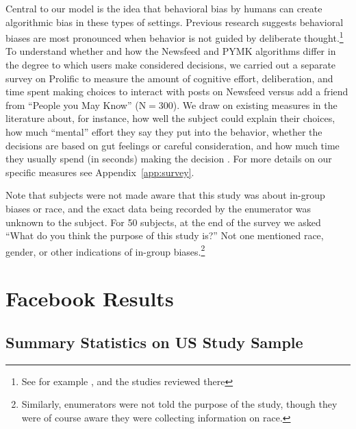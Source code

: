 \documentclass[12pt,letterpaper]{article}
\newcommand{\NFnPYMKIndiaSurveySampleSize}{200}
\newcommand{\ProlificSampleSize}{300}
\newcommand{\StudyAboutSampleSize}{50}
\begin{document}
Central to our model is the idea that behavioral bias by humans can create algorithmic bias in these types of settings. Previous research suggests behavioral biases are most pronounced when behavior is not guided by deliberate thought.\footnote{See for example \citet{payne2002best}, \citet{lueke2015mindfulness} and the studies reviewed there} To understand whether and how the Newsfeed and PYMK algorithms differ in the degree to which users make considered decisions, we carried out a separate survey on Prolific to measure the amount of cognitive effort, deliberation, and time spent making choices to interact with posts on Newsfeed versus add a friend from ``People you May Know'' (N$=$\ProlificSampleSize). We draw on existing measures in the literature about, for instance, how well the subject could explain their choices, how much ``mental'' effort they say they put into the behavior, whether the decisions are based on gut feelings or careful consideration, and how much time they usually spend (in seconds) making the decision \citep{bargh_1994}. For more details on our specific measures see Appendix~\ref{app:survey}.

Note that subjects were not made aware that this study was about in-group biases or race, and the exact data being recorded by the enumerator was unknown to the subject. For \StudyAboutSampleSize{} subjects, at the end of the survey we asked ``What do you think the purpose of this study is?'' Not one mentioned race, gender, or other indications of in-group biases.\footnote{Similarly, enumerators were not told the purpose of the study, though they were of course aware they were collecting information on race.}



\section{Facebook Results}

\subsection{Summary Statistics on US Study Sample}
\end{document}
